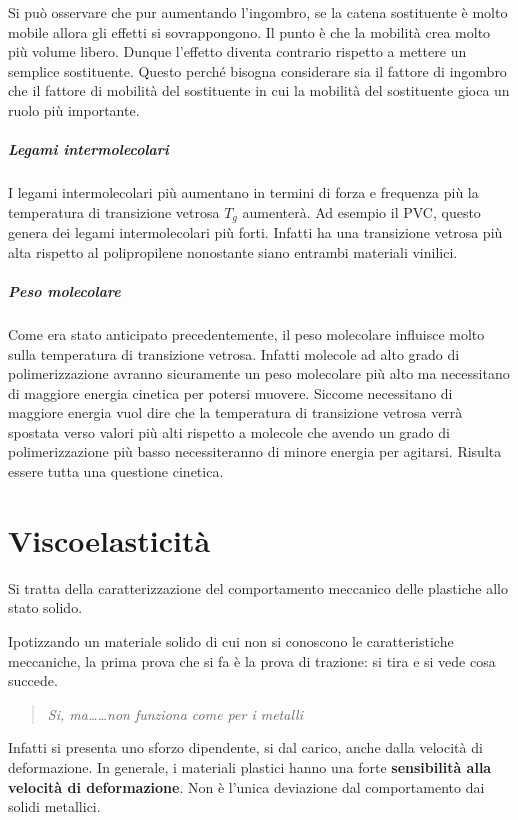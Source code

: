Si può osservare che pur aumentando l'ingombro, se la catena sostituente è molto mobile allora gli effetti si sovrappongono. Il punto è che la mobilità crea molto più volume libero. Dunque l'effetto diventa contrario rispetto a mettere un semplice sostituente. Questo perché bisogna considerare sia il fattore di ingombro che il fattore di mobilità del sostituente in cui la mobilità del sostituente gioca un ruolo più importante.

\paragraph{Legami intermolecolari}
I legami intermolecolari più aumentano in termini di forza e frequenza più la temperatura di transizione vetrosa $T_g$ aumenterà.
Ad esempio il \ac{PVC}, questo genera dei legami intermolecolari più forti. Infatti ha una transizione vetrosa più alta rispetto al polipropilene nonostante siano entrambi materiali vinilici. 

\paragraph{Peso molecolare}
Come era stato anticipato precedentemente, il peso molecolare influisce molto sulla temperatura di transizione vetrosa. Infatti molecole ad alto grado di polimerizzazione avranno sicuramente un peso molecolare più alto ma necessitano di maggiore energia cinetica per potersi muovere.
Siccome necessitano di maggiore energia vuol dire che la temperatura di transizione vetrosa verrà spostata verso valori più alti rispetto a molecole che avendo un grado di polimerizzazione più basso necessiteranno di minore energia per agitarsi.
Risulta essere tutta una questione cinetica.

\chapter{Viscoelasticità}\label{ch:viscoelasticità}
Si tratta della caratterizzazione del comportamento meccanico delle plastiche allo stato solido.

Ipotizzando un materiale solido di cui non si conoscono le caratteristiche meccaniche, la prima prova che si fa è la prova di trazione: si tira e si vede cosa succede.

\begin{quote}
\emph{Si, ma\dots \dots non funziona come per i metalli}
\end{quote}
Infatti si presenta uno sforzo dipendente, si dal carico, anche dalla velocità di deformazione.
In generale, i materiali plastici hanno una forte \textbf{sensibilità alla velocità di deformazione}.
Non è l'unica deviazione dal comportamento dai solidi metallici.

